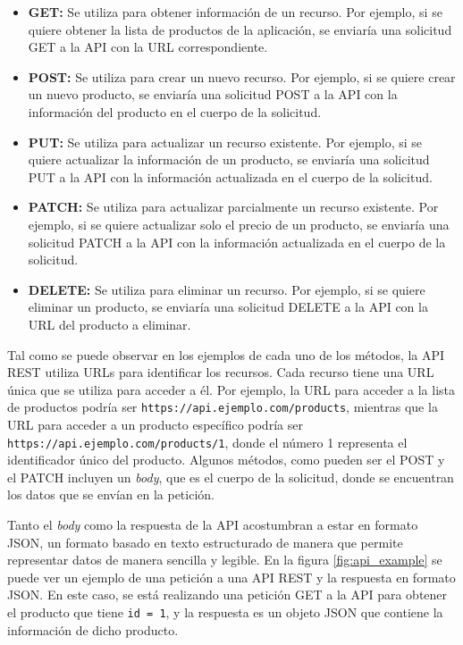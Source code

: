 \begin{itemize}
    \item \textbf{GET:} Se utiliza para obtener información de un recurso. Por ejemplo, si se quiere obtener la lista de productos de la aplicación, se enviaría una solicitud GET a la API con la URL correspondiente.
    \item \textbf{POST:} Se utiliza para crear un nuevo recurso. Por ejemplo, si se quiere crear un nuevo producto, se enviaría una solicitud POST a la API con la información del producto en el cuerpo de la solicitud.
    \item \textbf{PUT:} Se utiliza para actualizar un recurso existente. Por ejemplo, si se quiere actualizar la información de un producto, se enviaría una solicitud PUT a la API con la información actualizada en el cuerpo de la solicitud.
    \item \textbf{PATCH:} Se utiliza para actualizar parcialmente un recurso existente. Por ejemplo, si se quiere actualizar solo el precio de un producto, se enviaría una solicitud PATCH a la API con la información actualizada en el cuerpo de la solicitud.
    \item \textbf{DELETE:} Se utiliza para eliminar un recurso. Por ejemplo, si se quiere eliminar un producto, se enviaría una solicitud DELETE a la API con la URL del producto a eliminar.
\end{itemize}

Tal como se puede observar en los ejemplos de cada uno de los métodos, la API REST utiliza URLs para identificar los recursos. Cada recurso tiene una URL única que se utiliza para acceder a él. Por ejemplo, la URL para acceder a la lista de productos podría ser \texttt{https://api.ejemplo.com/products}, mientras que la URL para acceder a un producto específico podría ser \texttt{https://api.ejemplo.com/products/1}, donde el número 1 representa el identificador único del producto. Algunos métodos, como pueden ser el POST y el PATCH incluyen un \textit{body}, que es el cuerpo de la solicitud, donde se encuentran los datos que se envían en la petición.

Tanto el \textit{body} como la respuesta de la API acostumbran a estar en formato JSON, un formato basado en texto estructurado de manera que permite representar datos de manera sencilla y legible. En la figura \ref{fig:api_example} se puede ver un ejemplo de una petición a una API REST y la respuesta en formato JSON. En este caso, se está realizando una petición GET a la API para obtener el producto que tiene \texttt{id = 1}, y la respuesta es un objeto JSON que contiene la información de dicho producto.

